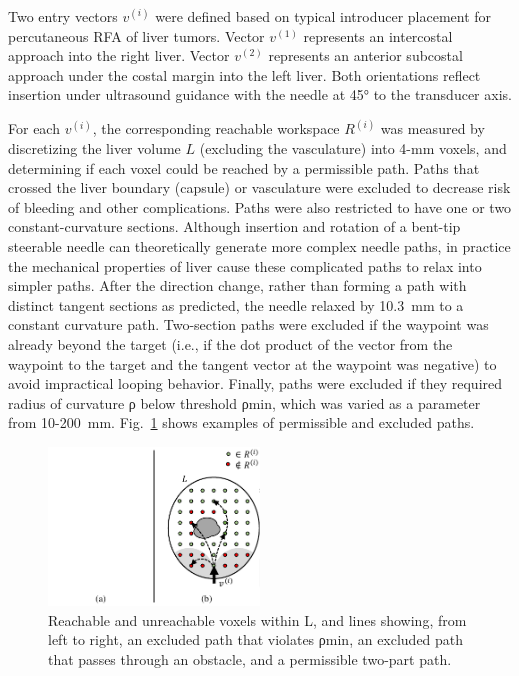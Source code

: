 Two entry vectors $v^{(i)}$ were defined based on typical introducer placement for percutaneous RFA of liver tumors. Vector $v^{(1)}$ represents an intercostal approach into the right liver. Vector $v^{(2)}$ represents an anterior subcostal approach under the costal margin into the left liver. Both orientations reflect insertion under ultrasound guidance with the needle at 45° to the transducer axis. 

For each $v^{(i)}$, the corresponding reachable workspace $R^{(i)}$ was measured by discretizing the liver volume $L$ (excluding the vasculature) into 4-mm voxels, and determining if each voxel could be reached by a permissible path. Paths that crossed the liver boundary (capsule) or vasculature were excluded to decrease risk of bleeding and other complications. Paths were also restricted to have one or two constant-curvature sections. Although insertion and rotation of a bent-tip steerable needle can theoretically generate more complex needle paths, in practice the mechanical properties of liver cause these complicated paths to relax into simpler paths.  After the direction change, rather than forming a path with distinct tangent sections as predicted, the needle relaxed by 10.3~mm to a constant curvature path. Two-section paths were excluded if the waypoint was already beyond the target (i.e., if the dot product of the vector from the waypoint to the target and the tangent vector at the waypoint was negative) to avoid impractical looping behavior. Finally, paths were excluded if they required radius of curvature ρ below threshold ρmin, which was varied as a parameter from 10-200~mm. Fig.~\ref{fig:Paths} shows examples of permissible and excluded paths. 
 
\begin{figure}[!t]
\centering
\includegraphics[width = 0.5\textwidth]{Images/Chapter3/Paths/Paths}%
\caption[Excluded and permissible paths]{Reachable and unreachable voxels within L, and lines showing, from left to right, an excluded path that violates ρmin, an excluded path that passes through an obstacle, and a permissible two-part path. }
\label{fig:Paths}
\end{figure}

